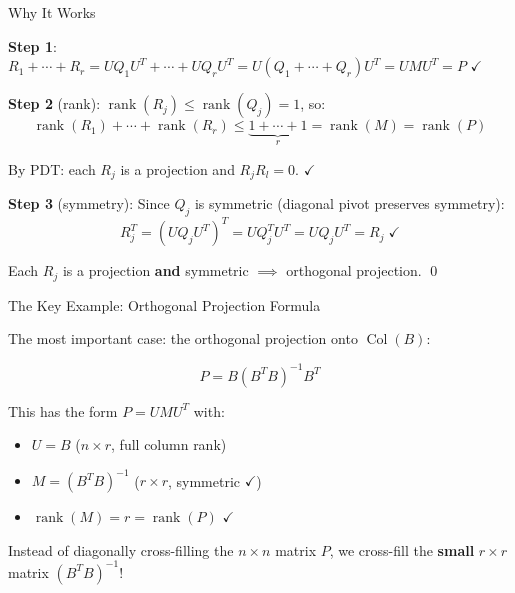 \documentclass[10pt]{beamer}
\theoremstyle{definition}
\newcommand{\x}[1]{\alert{\textbf{#1}}}
\begin{document}
\begin{frame}{Why It Works}

\x{Step 1}: $R_1 + \cdots + R_r = UQ_1U^T + \cdots + UQ_rU^T = U(Q_1 + \cdots + Q_r)U^T = UMU^T = P$ $\checkmark$

\vspace{0.5em}

\x{Step 2} (rank): $\operatorname{rank}(R_j) \leq \operatorname{rank}(Q_j) = 1$, so:
$$\operatorname{rank}(R_1) + \cdots + \operatorname{rank}(R_r) \leq \underbrace{1 + \cdots + 1}_{r} = \operatorname{rank}(M) = \operatorname{rank}(P)$$

By PDT: each $R_j$ is a projection and $R_j R_l = 0$. $\checkmark$

\vspace{0.5em}

\x{Step 3} (symmetry): Since $Q_j$ is symmetric (diagonal pivot preserves symmetry):
$$R_j^T = (UQ_jU^T)^T = UQ_j^TU^T = UQ_jU^T = R_j \;\checkmark$$

Each $R_j$ is a projection \x{and} symmetric $\implies$ orthogonal projection. \qed

\end{frame}


\begin{frame}{The Key Example: Orthogonal Projection Formula}

The most important case: the orthogonal projection onto $\operatorname{Col}(B)$:

$$P = B(B^TB)^{-1}B^T$$

\vspace{0.5em}

This has the form $P = UMU^T$ with:

\vspace{0.3em}

\begin{itemize}
\item $U = B$ \quad ($n \times r$, full column rank)
\item $M = (B^TB)^{-1}$ \quad ($r \times r$, symmetric $\checkmark$)
\item $\operatorname{rank}(M) = r = \operatorname{rank}(P)$ $\checkmark$
\end{itemize}

\vspace{0.5em}

Instead of diagonally cross-filling the $n \times n$ matrix $P$, we cross-fill the \x{small} $r \times r$ matrix $(B^TB)^{-1}$!

\end{frame}
\end{document}
